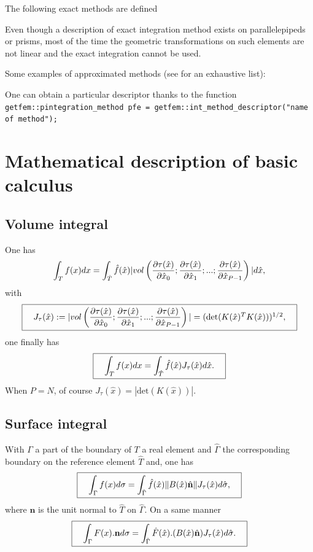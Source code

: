 \documentclass[11pt,a4paper]{article}
\begin{document}
The following exact methods are defined



Even though a description of exact integration method exists on parallelepipeds or prisms, most of the time the geometric transformations on such elements are not linear and the exact integration cannot be used.

Some examples of approximated methods (see \cite{FEM_LIST} for an exhaustive list):


One can obtain a particular descriptor thanks to the function\\[0.5cm]
{\tt getfem::pintegration\_method pfe = getfem::int\_method\_descriptor("name of method"); }\\[0.5cm]


\section{Mathematical description of basic calculus}

\subsection{Volume integral}
One has
$$ \int_T f(x) dx = \int_{\hat{T}} \hat{f}(\hat{x}) |vol\left({\displaystyle \frac{\displaystyle \partial \tau(\hat{x})}{\displaystyle \partial \hat{x}_0}} ;{\displaystyle \frac{\displaystyle \partial \tau(\hat{x})}{\displaystyle \partial \hat{x}_1}}; ...; {\displaystyle \frac{\displaystyle \partial \tau(\hat{x})}{\displaystyle \partial \hat{x}_{P-1} }}\right)| d\hat{x}, $$
with
$$ \fbox{$\hspace{1em} J_{\tau}(\hat{x}) := |vol\left({\displaystyle \frac{\displaystyle \partial \tau(\hat{x})}{\displaystyle \partial \hat{x}_0}} ;{\displaystyle \frac{\displaystyle \partial \tau(\hat{x})}{\displaystyle \partial \hat{x}_1}}; ...; {\displaystyle \frac{\displaystyle \partial \tau(\hat{x})}{\displaystyle \partial \hat{x}_{P-1} }}\right)| = (\mbox{det}(K(\hat{x})^T K(\hat{x})))^{1/2},\hspace{1em}$} $$
one finally has
$$ \fbox{$\hspace{1em} \displaystyle \int_T f(x) dx = \int_{\hat{T}} \hat{f}(\hat{x})  J_{\tau}(\hat{x})d\hat{x}.\hspace{1em}$} $$
When $P = N$, of course $J_{\tau}(\hat{x}) = |\mbox{det}(K(\hat{x}))|$.

\subsection{Surface integral}
With $\Gamma$ a part of the boundary of $T$ a real element and $\hat{\Gamma}$ the corresponding boundary on the reference element $\hat{T}$ and, one has
$$ \fbox{$\hspace{1em} \displaystyle \int_{\Gamma} f(x) d\sigma = \int_{\hat{\Gamma}} \hat{f}(\hat{x}) \|B(\hat{x})\hat{\mathbf n}\| J_{\tau}(\hat{x}) d\hat{\sigma},\hspace{1em}$} $$
where ${\mathbf n}$ is the unit normal to $\hat{T}$ on $\hat{\Gamma}$. On a same manner
$$ \fbox{$\hspace{1em} \displaystyle \int_{\Gamma} F(x).{\mathbf n} d\sigma = \int_{\hat{\Gamma}} \hat{F}(\hat{x}).(B(\hat{x})\hat{\mathbf n}) J_{\tau}(\hat{x}) d\hat{\sigma}.\hspace{1em}$} $$
\end{document}
